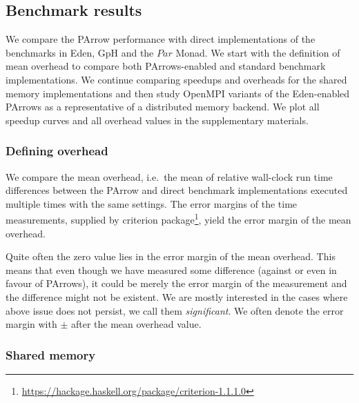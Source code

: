 \documentclass{jfp1}
\newcommand{\Conid}[1]{\mathit{#1}}
\DeclareRobustCommand{\hairspn}{\hspace{1pt}\nolinebreak}%
\DeclareRobustCommand{\ie}{{i.\hairspn{}e.~}}
\begin{document}


\subsection{Benchmark results}\label{sec:benchmarkResults}

We compare the PArrow performance with direct implementations of the benchmarks in Eden, GpH and the \ensuremath{\Conid{Par}} Monad.
We start with the definition of mean overhead to compare both PArrows-enabled and standard benchmark implementations. We continue comparing speedups and overheads for the shared memory implementations and then study OpenMPI variants of the Eden-enabled PArrows as a representative of a distributed memory backend. We plot all speedup curves and all overhead values in the supplementary materials.

\subsubsection{Defining overhead}

We compare the mean overhead, \ie the mean of relative wall-clock run time differences between the PArrow and direct benchmark implementations executed multiple times with the same settings.
The error margins of the time measurements, supplied by criterion package\footnote{\url{https://hackage.haskell.org/package/criterion-1.1.1.0}}, yield the error margin of the mean overhead. 

Quite often the zero value lies in the error margin of the mean overhead. This means that even though we have measured some difference (against or even in favour of PArrows), it could be merely the error margin of the measurement and the difference might not be existent. We are mostly interested in the cases where above issue does not persist, we call them \emph{significant}. We often denote the error margin with $\pm$ after the mean overhead value.

\subsubsection{Shared memory}
\end{document}
